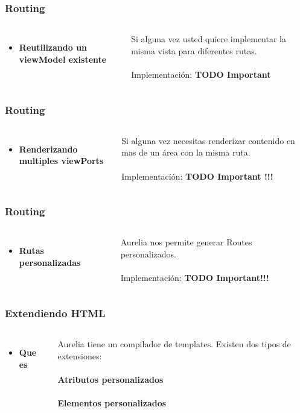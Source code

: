 \documentclass{beamer}
\begin{document}
\begin{frame}
\frametitle{Routing}
\begin{columns}[c]
\begin{itemize}
\item \textbf{Reutilizando un viewModel existente}
\end{itemize}
Si alguna vez usted quiere implementar la misma vista para diferentes rutas.
\\~\\
Implementaci\'on: \textbf{TODO Important}
\end{columns}
\end{frame}
\begin{frame}
\frametitle{Routing}
\begin{columns}[c]
\begin{itemize}
\item \textbf{Renderizando multiples viewPorts}
\end{itemize}
Si alguna vez necesitas renderizar contenido en mas de un \'area con la misma ruta.
\\~\\
Implementaci\'on: \textbf{TODO Important !!!}
\end{columns}
\end{frame}
\begin{frame}
\frametitle{Routing}
\begin{columns}[c]
\begin{itemize}
\item \textbf{Rutas personalizadas}
\end{itemize}
Aurelia nos permite generar Routes personalizados.
\\~\\
Implementaci\'on: \textbf{TODO Important!!!}
\end{columns}
\end{frame}
\begin{frame}
\frametitle{Extendiendo HTML}
\begin{columns}[c]
\begin{itemize}
\item \textbf{Que es}
\end{itemize}
Aurelia tiene un compilador de templates. Existen dos tipos de extensiones:
\\~\\
\textbf{Atributos personalizados}
\\~\\
\textbf{Elementos personalizados}
\end{columns}
\end{frame}
\end{document}
